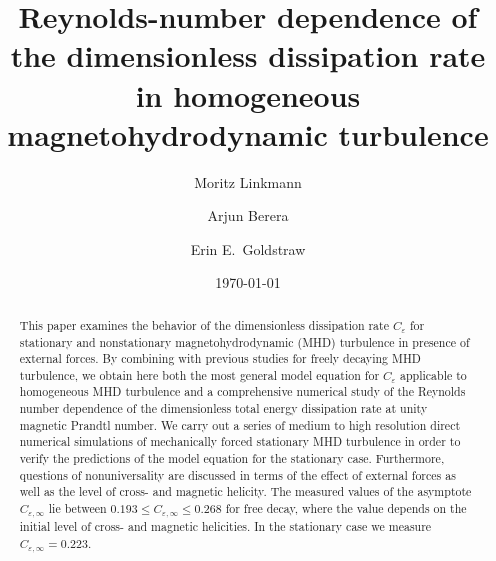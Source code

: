 \documentclass[aps,pre,onecolumn,superscriptaddress,notitlepage]{revtex4-1}
\newcommand{\Ceps}{C_\varepsilon}
\newcommand{\Cinf}{C_{\varepsilon,\infty}}
\newcommand{\blue}[1]{{#1}}
\begin{document}
\title{Reynolds-number dependence of the dimensionless dissipation
       rate in homogeneous magnetohydrodynamic turbulence}

\author{Moritz Linkmann}

\author{Arjun Berera}

\author{Erin E.~Goldstraw}

\date{\today}

\begin{abstract} 
This paper examines the behavior of the dimensionless dissipation rate $\Ceps$
for stationary and nonstationary magnetohydrodynamic (MHD) turbulence in
presence of external forces. By combining with previous studies for freely
decaying MHD turbulence, we obtain here both the most general model equation
for $\Ceps$ applicable to homogeneous MHD turbulence and a comprehensive
numerical study of the Reynolds number dependence of the dimensionless total
energy dissipation rate \blue{at unity magnetic Prandtl number}.  
We carry out a series of medium to high resolution
direct numerical simulations of mechanically forced stationary MHD turbulence
in order to verify the predictions of the model equation for the stationary
case. Furthermore, questions of nonuniversality are discussed in terms of the
effect of external forces as well as the level of cross- and magnetic helicity.
The measured values of the asymptote $\Cinf$ lie between $0.193 \leqslant \Cinf
\leqslant 0.268$ for free decay, where the value depends on the initial level
of cross- and magnetic helicities. In the stationary case we measure $\Cinf =
0.223$.
\end{abstract}

\maketitle
\end{document}
